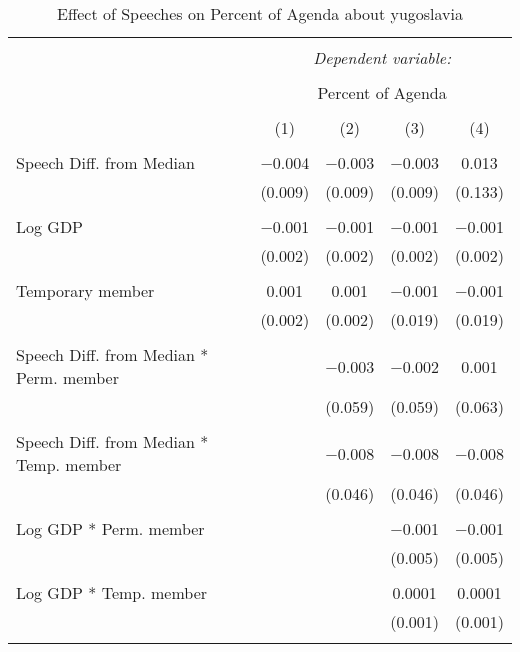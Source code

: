 
\begin{table}[!htbp] \centering 
  \caption{Effect of Speeches on Percent of Agenda about  yugoslavia} 
  \label{} 
\begin{tabular}{@{\extracolsep{5pt}}lcccc} 
\\[-1.8ex]\hline 
\hline \\[-1.8ex] 
 & \multicolumn{4}{c}{\textit{Dependent variable:}} \\ 
\cline{2-5} 
\\[-1.8ex] & \multicolumn{4}{c}{Percent of Agenda} \\ 
\\[-1.8ex] & (1) & (2) & (3) & (4)\\ 
\hline \\[-1.8ex] 
 Speech Diff. from Median & $-$0.004 & $-$0.003 & $-$0.003 & 0.013 \\ 
  & (0.009) & (0.009) & (0.009) & (0.133) \\ 
  & & & & \\ 
 Log GDP & $-$0.001 & $-$0.001 & $-$0.001 & $-$0.001 \\ 
  & (0.002) & (0.002) & (0.002) & (0.002) \\ 
  & & & & \\ 
 Temporary member & 0.001 & 0.001 & $-$0.001 & $-$0.001 \\ 
  & (0.002) & (0.002) & (0.019) & (0.019) \\ 
  & & & & \\ 
 Speech Diff. from Median * Perm. member &  & $-$0.003 & $-$0.002 & 0.001 \\ 
  &  & (0.059) & (0.059) & (0.063) \\ 
  & & & & \\ 
 Speech Diff. from Median * Temp. member &  & $-$0.008 & $-$0.008 & $-$0.008 \\ 
  &  & (0.046) & (0.046) & (0.046) \\ 
  & & & & \\ 
 Log GDP * Perm. member &  &  & $-$0.001 & $-$0.001 \\ 
  &  &  & (0.005) & (0.005) \\ 
  & & & & \\ 
 Log GDP * Temp. member &  &  & 0.0001 & 0.0001 \\ 
  &  &  & (0.001) & (0.001) \\ 
  & & & & \\ 

\end{tabular}
\end{table}
